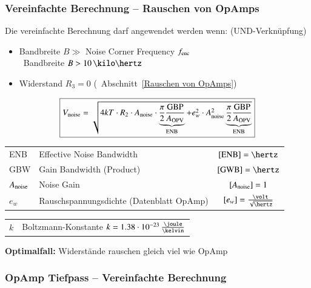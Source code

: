 \subsubsection{Vereinfachte Berechnung -- Rauschen von OpAmps}

Die vereinfachte Berechnung darf angewendet werden wenn: (UND-Verknüpfung)
\begin{itemize}
    \item Bandbreite $B \gg$ Noise Corner Frequency $f_{\rm enc}$ \\
        \textrightarrow\ Bandbreite $B > 10 \, \kilo \hertz$
    \item Widerstand $R_3 = 0$ (\textrightarrow\ Abschnitt~\ref{Rauschen von OpAmps})
\end{itemize}

$$ \boxed{ V_{\rm noise} = \sqrt{4 k T \cdot R_2 \cdot A_{\rm noise} \cdot \underbrace{ \frac{\pi}{2} \frac{\text{GBP}}{A_{\rm OPV}} }_{\text{ENB}}
+ e_w^2 \cdot A_{\rm noise}^2 \underbrace{ \frac{\pi}{2} \frac{\text{GBP}}{A_{\rm OPV}} }_{\text{ENB}} }} $$

\begin{tabular}{llc}
    ENB             & Effective Noise Bandwidth                 & $[\text{ENB}] = \hertz$ \\
    GBW             & Gain Bandwidth (Product)                  & $[\text{GWB}] = \hertz$ \\
    $A_{\rm noise}$ & Noise Gain                                & $[A_{\rm noise}] = 1$ \\
    $e_w$           & Rauschspannungsdichte (Datenblatt OpAmp)  & $[e_w] = \frac{\volt}{\sqrt{\hertz}}$ \\
\end{tabular}

\begin{tabular}{ll}
    $k$             & Boltzmann-Konstante $k = 1.38 \cdot 10^{-23} \, \frac{\joule}{\kelvin}$ \\
\end{tabular}
    
\textbf{Optimalfall:} Widerstände rauschen gleich viel wie OpAmp


\subsubsection{OpAmp Tiefpass -- Vereinfachte Berechnung}

